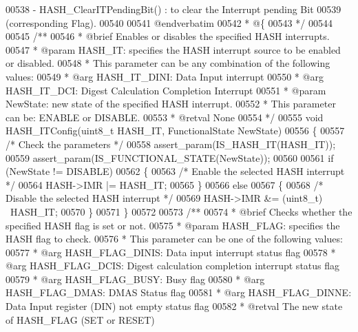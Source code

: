 \begin{DoxyCode}
00538 \textcolor{comment}{      - HASH\_ClearITPendingBit() : to clear the Interrupt pending Bit }
00539 \textcolor{comment}{                                (corresponding Flag). }
00540 \textcolor{comment}{}
00541 \textcolor{comment}{@endverbatim}
00542 \textcolor{comment}{  * @\{}
00543 \textcolor{comment}{  */}
00544 
00545 \textcolor{comment}{/**}
00546 \textcolor{comment}{  * @brief  Enables or disables the specified HASH interrupts.}
00547 \textcolor{comment}{  * @param  HASH\_IT: specifies the HASH interrupt source to be enabled or disabled.}
00548 \textcolor{comment}{  *          This parameter can be any combination of the following values:}
00549 \textcolor{comment}{  *            @arg HASH\_IT\_DINI: Data Input interrupt}
00550 \textcolor{comment}{  *            @arg HASH\_IT\_DCI: Digest Calculation Completion Interrupt}
00551 \textcolor{comment}{  * @param  NewState: new state of the specified HASH interrupt.}
00552 \textcolor{comment}{  *           This parameter can be: ENABLE or DISABLE.}
00553 \textcolor{comment}{  * @retval None}
00554 \textcolor{comment}{  */}
00555 \textcolor{keywordtype}{void} HASH_ITConfig(uint8\_t HASH\_IT, FunctionalState NewState)
00556 \{
00557   \textcolor{comment}{/* Check the parameters */}
00558   assert_param(IS\_HASH\_IT(HASH\_IT));
00559   assert_param(IS\_FUNCTIONAL\_STATE(NewState));
00560 
00561   \textcolor{keywordflow}{if} (NewState != DISABLE)
00562   \{
00563     \textcolor{comment}{/* Enable the selected HASH interrupt */}
00564     HASH->IMR |= HASH\_IT;
00565   \}
00566   \textcolor{keywordflow}{else}
00567   \{
00568     \textcolor{comment}{/* Disable the selected HASH interrupt */}
00569     HASH->IMR &= (uint8\_t) ~HASH\_IT;
00570   \}
00571 \}
00572 
00573 \textcolor{comment}{/**}
00574 \textcolor{comment}{  * @brief  Checks whether the specified HASH flag is set or not.}
00575 \textcolor{comment}{  * @param  HASH\_FLAG: specifies the HASH flag to check.}
00576 \textcolor{comment}{  *          This parameter can be one of the following values:}
00577 \textcolor{comment}{  *            @arg HASH\_FLAG\_DINIS: Data input interrupt status flag}
00578 \textcolor{comment}{  *            @arg HASH\_FLAG\_DCIS: Digest calculation completion interrupt status flag}
00579 \textcolor{comment}{  *            @arg HASH\_FLAG\_BUSY: Busy flag}
00580 \textcolor{comment}{  *            @arg HASH\_FLAG\_DMAS: DMAS Status flag}
00581 \textcolor{comment}{  *            @arg HASH\_FLAG\_DINNE: Data Input register (DIN) not empty status flag}
00582 \textcolor{comment}{  * @retval The new state of HASH\_FLAG (SET or RESET)}

\end{DoxyCode}
